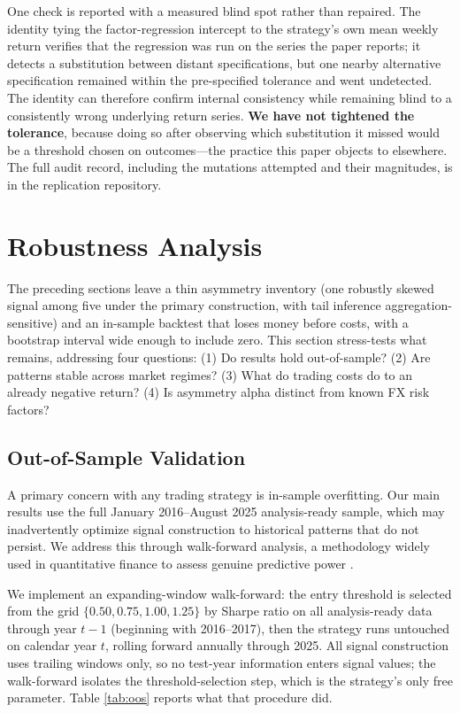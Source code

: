 \documentclass[11pt]{article}
\begin{document}
One check is reported with a measured blind spot rather than repaired. The identity tying the factor-regression intercept to the strategy's own mean weekly return verifies that the regression was run on the series the paper reports; it detects a substitution between distant specifications, but one nearby alternative specification remained within the pre-specified tolerance and went undetected. The identity can therefore confirm internal consistency while remaining blind to a consistently wrong underlying return series. \textbf{We have not tightened the tolerance}, because doing so after observing which substitution it missed would be a threshold chosen on outcomes---the practice this paper objects to elsewhere. The full audit record, including the mutations attempted and their magnitudes, is in the replication repository.

\section{Robustness Analysis}
\label{sec:robustness}

The preceding sections leave a thin asymmetry inventory (one robustly skewed signal among five under the primary construction, with tail inference aggregation-sensitive) and an in-sample backtest that loses money before costs, with a bootstrap interval wide enough to include zero. This section stress-tests what remains, addressing four questions: (1) Do results hold out-of-sample? (2) Are patterns stable across market regimes? (3) What do trading costs do to an already negative return? (4) Is asymmetry alpha distinct from known FX risk factors?

\subsection{Out-of-Sample Validation}

A primary concern with any trading strategy is in-sample overfitting. Our main results use the full January 2016--August 2025 analysis-ready sample, which may inadvertently optimize signal construction to historical patterns that do not persist. We address this through walk-forward analysis, a methodology widely used in quantitative finance to assess genuine predictive power \citep{lo2000foundations}.

We implement an expanding-window walk-forward: the entry threshold is selected from the grid $\{0.50, 0.75, 1.00, 1.25\}$ by Sharpe ratio on all analysis-ready data through year $t-1$ (beginning with 2016--2017), then the strategy runs untouched on calendar year $t$, rolling forward annually through 2025. All signal construction uses trailing windows only, so no test-year information enters signal values; the walk-forward isolates the threshold-selection step, which is the strategy's only free parameter. Table \ref{tab:oos} reports what that procedure did.
\end{document}
